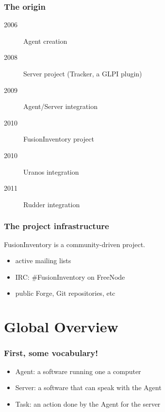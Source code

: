 \documentclass{beamer}
\begin{document}
\begin{frame}
    \frametitle{The origin}

    \begin{description}
      \item[2006] Agent creation
      \item[2008] Server project (Tracker, a GLPI plugin)
      \item[2009] Agent/Server integration 
      \item[2010] FusionInventory project
      \item[2010] Uranos integration
      \item[2011] Rudder integration
    \end{description}

\end{frame}



\begin{frame}
    \frametitle{The project infrastructure}
    FusionInventory is a community-driven project.

    \begin{itemize}
        \item active mailing lists
        \item IRC: \#FusionInventory on FreeNode
        \item public Forge, Git repositories, etc
    \end{itemize}
\end{frame}

\section{Global Overview}

\begin{frame}
    \frametitle{First, some vocabulary!}

    \begin{itemize}
        \item Agent: a software running one a computer
        \item Server: a software that can speak with the Agent
        \item Task: an action done by the Agent for the server 
    \end{itemize}

\end{frame}
\end{document}

